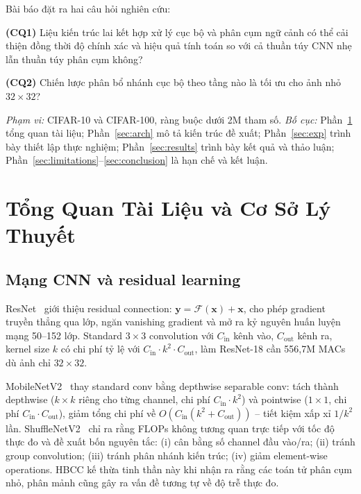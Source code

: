 \documentclass[journal]{IEEEtran}
\begin{document}
Bài báo đặt ra hai câu hỏi nghiên cứu:

\noindent\textbf{(CQ1)} Liệu kiến trúc lai kết hợp xử lý cục bộ và
phân cụm ngữ cảnh có thể cải thiện đồng thời độ chính xác và hiệu
quả tính toán so với cả thuần túy CNN nhẹ lẫn thuần túy phân cụm không?

\noindent\textbf{(CQ2)} Chiến lược phân bổ nhánh cục bộ theo tầng nào
là tối ưu cho ảnh nhỏ $32\!\times\!32$?

\noindent\textit{Phạm vi:} CIFAR-10 và CIFAR-100, ràng buộc dưới 2M
tham số. \textit{Bố cục:} Phần~\ref{sec:related} tổng quan tài liệu;
Phần~\ref{sec:arch} mô tả kiến trúc đề xuất;
Phần~\ref{sec:exp} trình bày thiết lập thực nghiệm;
Phần~\ref{sec:results} trình bày kết quả và thảo luận;
Phần~\ref{sec:limitations}--\ref{sec:conclusion} là hạn chế và kết luận.

\section{Tổng Quan Tài Liệu và Cơ Sở Lý Thuyết}
\label{sec:related}

\subsection{Mạng CNN và residual learning}

ResNet~\cite{He2016ResNet} giới thiệu residual connection:
$\mathbf{y} = \mathcal{F}(\mathbf{x}) + \mathbf{x}$,
cho phép gradient truyền thẳng qua lớp, ngăn vanishing gradient và
mở ra kỷ nguyên huấn luyện mạng 50--152 lớp. Standard $3\!\times\!3$
convolution với $C_{\mathrm{in}}$ kênh vào, $C_{\mathrm{out}}$ kênh ra,
kernel size $k$ có chi phí tỷ lệ với
$C_{\mathrm{in}}\!\cdot\!k^2\!\cdot\!C_{\mathrm{out}}$, làm ResNet-18
cần 556,7M MACs dù ảnh chỉ $32\!\times\!32$.

MobileNetV2~\cite{Sandler2018MobileNetV2} thay standard conv bằng
depthwise separable conv: tách thành depthwise ($k\!\times\!k$ riêng
cho từng channel, chi phí $C_{\mathrm{in}}\!\cdot\!k^2$) và pointwise
($1\!\times\!1$, chi phí $C_{\mathrm{in}}\!\cdot\!C_{\mathrm{out}}$),
giảm tổng chi phí về $O(C_{\mathrm{in}}(k^2 + C_{\mathrm{out}}))$ --
tiết kiệm xấp xỉ $1/k^2$ lần. ShuffleNetV2~\cite{Ma2018ShuffleNetV2}
chỉ ra rằng FLOPs không tương quan trực tiếp với tốc độ thực đo và
đề xuất bốn nguyên tắc: (i) cân bằng số channel đầu vào/ra; (ii)
tránh group convolution; (iii) tránh phân nhánh kiến trúc; (iv) giảm
element-wise operations. HBCC kế thừa tinh thần này khi nhận ra rằng
các toán tử phân cụm nhỏ, phân mảnh cũng gây ra vấn đề tương tự về
độ trễ thực đo.
\end{document}
